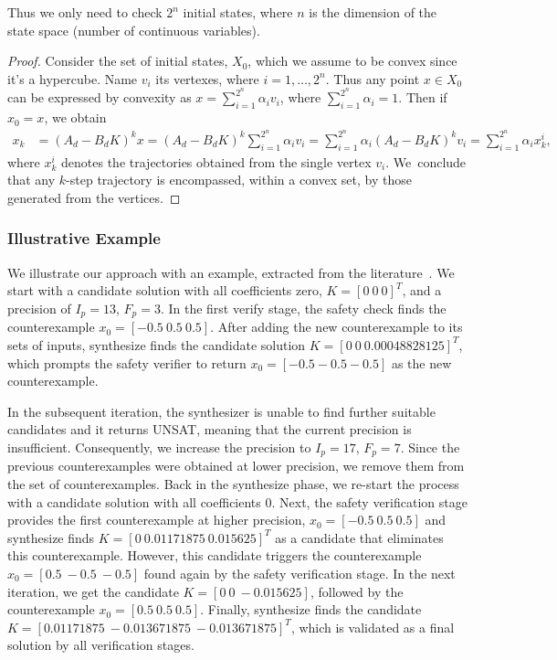 \documentclass[runningheads,a4paper]{llncs}
\begin{document}
Thus we only need to check $2^n$ initial states, where $n$
is the dimension of the state space (number of continuous variables). 
\begin{proof}
Consider the set of initial states, $X_0$, which we assume to be convex since it's a hypercube. 
Name $v_i$ its vertexes, where $i=1,\ldots, 2^n$.  
Thus any point $x \in X_0$ can be expressed by convexity as $x = \sum_{i=1}^{2^n} \alpha_i v_i$, 
where $\sum_{i=1}^{2^n} \alpha_i =1$. Then if $x_0=x$, we obtain 
\begin{align*}
x_k   &= (A_d - B_d K)^k x = (A_d - B_d K)^k \sum_{i=1}^{2^n} \alpha_i v_i 
      = \sum_{i=1}^{2^n} \alpha_i (A_d - B_d K)^k v_i = \sum_{i=1}^{2^n} \alpha_i x_k^i, 
 \end{align*}     
%
where $x_k^i$ denotes the trajectories obtained from the single vertex
$v_i$.  We~conclude that any $k$-step trajectory is encompassed, within a
convex set, by those generated from the vertices.
\end{proof}

\subsubsection{Illustrative Example} \label{sec:running-ex}

We illustrate our approach with an example,
extracted from the literature~\cite{Franklin15}.
%
We start with a candidate solution with all coefficients zero, $K=[0
  \ 0 \ 0]^T$, and a precision of $I_p=13$, $F_p=3$.  In the first
{\sc verify} stage, the {\sc safety} check finds the counterexample
%
$ x_0 = [-0.5 \ 0.5 \ 0.5] $.
%
After adding the new counterexample to its sets of {\sc inputs}, {\sc
  synthesize} finds the candidate solution $K=[0 \ 0
  \ 0.00048828125]^T$, which prompts the {\sc safety} verifier to
return $x_0=[-0.5 -0.5 -0.5]$ as the new counterexample.

In the subsequent iteration, the synthesizer is unable to find further 
suitable candidates and it returns UNSAT, meaning that the current precision is
insufficient.  Consequently, we increase the precision to $I_p=17$,
$F_p=7$.
%
Since the previous counterexamples were obtained at lower precision,
we remove them from the set of counterexamples.  Back in the {\sc
  synthesize} phase, we re-start the process with a candidate solution
with all coefficients $0$.  Next, the {\sc safety} verification stage
provides the first counterexample at higher precision, $x_0=[-0.5
  \ 0.5 \ 0.5]$ and {\sc synthesize} finds $K=[0 \ 0.01171875
  \ 0.015625]^T$ as a candidate that eliminates this counterexample.
However, this candidate triggers the counterexample
$x_0=[0.5\ -0.5\ -0.5]$ found again by the {\sc safety} verification
stage.  In the next iteration, we get the candidate $K=[0 \ 0
  \ -0.015625]$, followed by the counterexample $x_0 = [0.5 \ 0.5
  \ 0.5]$. Finally, {\sc synthesize} finds the candidate $K=[0.01171875
  \ -0.013671875 \ -0.013671875]^T$, which is validated as a final
solution by all verification stages.
\end{document}
